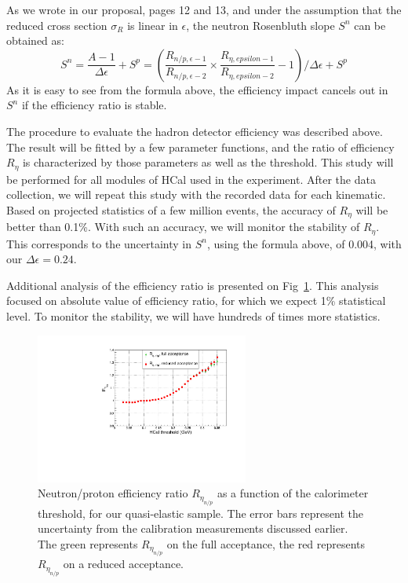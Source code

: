 As we wrote in our proposal, pages 12 and 13, and under the assumption that the reduced cross section $\sigma_R$ is linear in $\epsilon$,
the neutron Rosenbluth slope $S^n$ can be obtained as:
%
\begin{equation}
  S^n = \frac{A-1}{\Delta\epsilon} + S^p = (\frac{R_{n/p, \epsilon-1}}{R_{n/p, \epsilon-2}}\times \frac{R_{\eta, epsilon-1}}{R_{\eta, epsilon-2}}-1)/\Delta\epsilon + S^p
  \label{eq:Sn}
\end{equation}
%
As it is easy to see from the formula above, the efficiency impact cancels out in $S^n$ if the efficiency ratio is stable.

The procedure to evaluate the hadron detector efficiency was described above.
The result will be fitted by a few parameter functions, and the ratio of efficiency $R_{\eta}$ is characterized by those parameters as well as the threshold.
This study will be performed for all modules of HCal used in the experiment.
After the data collection, we will repeat this study with the recorded data for each kinematic.
Based on projected statistics of a few million events, the accuracy of $R_{\eta}$ will be better than 0.1\%.
With such an accuracy, we will monitor the stability of $R_{\eta}$.
This corresponds to the uncertainty in $S^n$, using the formula above, of 0.004, with our $\Delta \epsilon = 0.24$. 

Additional analysis of the efficiency ratio is presented on Fig~\ref{fig:Reta_np}.
This analysis focused on absolute value of efficiency ratio, for which we expect 1\% statistical level.
To monitor the stability, we will have hundreds of times more statistics.
%
\begin{figure}[!h]
  \centering
  \includegraphics[width=7cm]{Answers_Readers/Reta_np_fthr_errs.pdf}
  \caption{Neutron/proton efficiency ratio $R_{\eta_{n/p}}$ as a function of the calorimeter threshold, for our quasi-elastic sample. The error bars represent the uncertainty from the calibration measurements discussed earlier. The green represents $R_{\eta_{n/p}}$ on the full acceptance, the red represents $R_{\eta_{n/p}}$ on a reduced acceptance. %
            }
  \label{fig:Reta_np}
\end{figure}
%

